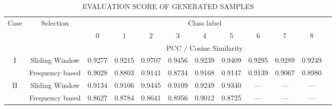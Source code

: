 \begin{table}[htbp]
\centering
\caption{EVALUATION SCORE OF GENERATED SAMPLES}
\label{tab:similarity}
\begin{tabular}{cccccccccccc}
\toprule
\multirow{2}{*}{Case} & \multirow{2}{*}{Selection} & \multicolumn{9}{c}{Class label} \\
 & & 0 & 1 & 2 & 3 & 4 & 5 & 6 & 7 & 8 \\
\cline{3-11}
 & & \multicolumn{9}{c}{PCC / Cosine Similarity} \\
\midrule
I & Sliding Window & 0.9277 & 0.9215 & 0.9707 & 0.9456 & 0.9239 & 0.9409 & 0.9295 & 0.9289 & 0.9249 \\
 & Frequency based & 0.9028 & 0.8803 & 0.9141 & 0.8734 & 0.9168 & 0.9147 & 0.9139 & 0.9067 & 0.8980 \\
II & Sliding Window & 0.9134 & 0.9106 & 0.9445 & 0.9109 & 0.9249 & 0.9340 & --- & --- & --- \\
 & Frequency based & 0.8627 & 0.8784 & 0.8641 & 0.8956 & 0.9012 & 0.8725 & --- & --- & --- \\
\bottomrule
\end{tabular}
\end{table}
